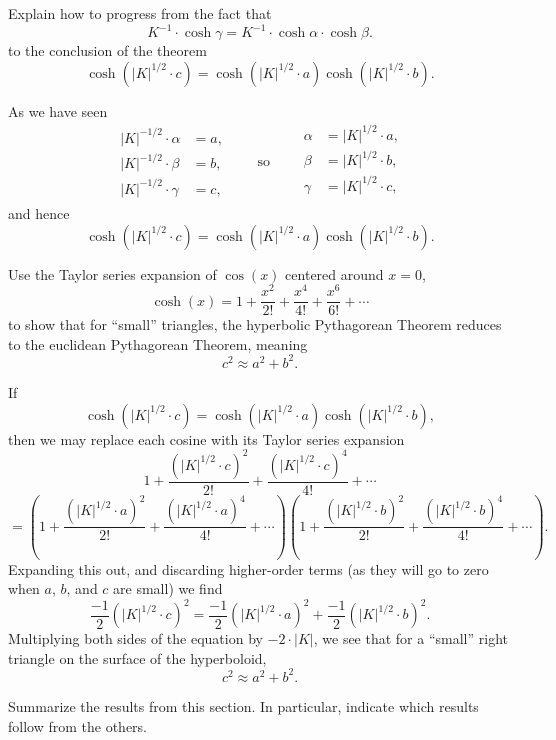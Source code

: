 \documentclass{ximera}
\begin{document}
\begin{problem}
  Explain how to progress from the fact that
  \[
  K^{-1}\cdot \cosh \gamma = K^{-1} \cdot \cosh\alpha \cdot \cosh\beta.
  \]
  to the conclusion of the theorem
  \[
  \cosh\left(|K|^{1/2}\cdot c\right)=\cosh\left(|K|^{1/2} \cdot a\right)\cosh\left(|K|^{1/2}\cdot b\right).
  \]
  \begin{freeResponse}
    As we have seen
    \[
    \begin{split}
      |K|^{-1/2}\cdot \alpha &= a,\\
      |K|^{-1/2}\cdot \beta  &= b,\\
      |K|^{-1/2}\cdot \gamma &= c,
    \end{split}
    \qquad\text{so}\qquad
    \begin{split}
      \alpha &= |K|^{1/2} \cdot a,\\
      \beta  &= |K|^{1/2} \cdot b,\\
      \gamma &= |K|^{1/2} \cdot c,\\
    \end{split}
    \]
    and hence
    \[
      \cosh\left(|K|^{1/2}\cdot c\right)=\cosh\left(|K|^{1/2} \cdot a\right)\cosh\left(|K|^{1/2}\cdot b\right).
    \]
  \end{freeResponse}
\end{problem}


\begin{problem}
  Use the Taylor series expansion of $\cos(x)$ centered around $x=0$,
  \[
  \cosh(x) = 1 + \frac{x^2}{2!} + \frac{x^4}{4!} + \frac{x^6}{6!} + \cdots
  \]
to show that for ``small'' triangles, the hyperbolic Pythagorean
Theorem reduces to the euclidean Pythagorean Theorem, meaning
\[
c^2 \approx a^2+b^2.
\]
\begin{freeResponse}
  If
  \[
  \cosh\left(|K|^{1/2}\cdot c\right)=\cosh\left(|K|^{1/2}\cdot a\right)\cosh\left(|K|^{1/2}\cdot b\right),
  \]
  then we may replace each cosine with its Taylor series expansion
  \[
  1 + \frac{\left(|K|^{1/2}\cdot c\right)^2}{2!} + \frac{\left(|K|^{1/2}\cdot c\right)^4}{4!} +  \cdots
  \]
  \[
  =\left(
  1 + \frac{\left(|K|^{1/2}\cdot a\right)^2}{2!} + \frac{\left(|K|^{1/2}\cdot a\right)^4}{4!} +  \cdots
  \right)
  \left(
  1 + \frac{\left(|K|^{1/2}\cdot b\right)^2}{2!} + \frac{\left(|K|^{1/2}\cdot b\right)^4}{4!} + \cdots
  \right).
  \]
  Expanding this out, and discarding higher-order terms (as they will
  go to zero when $a$, $b$, and $c$ are small) we find
  \[
  \frac{-1}{2}\left(|K|^{1/2}\cdot c\right)^2 = \frac{-1}{2}\left(|K|^{1/2}\cdot a\right)^2+\frac{-1}{2}\left(|K|^{1/2}\cdot b\right)^2.
  \]
  Multiplying both sides of the equation by $-2\cdot |K|$, we see that for a
  ``small'' right triangle on the surface of the hyperboloid,
  \[
  c^2 \approx a^2 +b^2.
  \]
\end{freeResponse}
\end{problem}


\begin{problem}
Summarize the results from this section. In particular, indicate which
results follow from the others.
\begin{freeResponse}
\end{freeResponse}
\end{problem}
\end{document}
